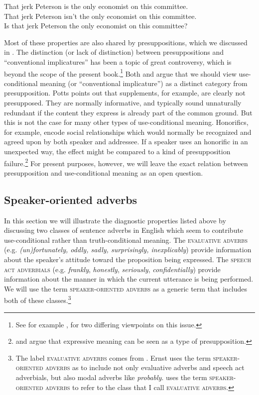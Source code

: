 \ea \label{ex:11.3}
\ea That jerk Peterson is the only economist on this committee.\\
\ex That jerk Peterson isn’t the only economist on this committee.\\
\ex Is that jerk Peterson the only economist on this committee?\\
                       \z
\z


 Most of these properties are also shared by presuppositions, which we discussed in . The distinction (or lack of distinction) between presuppositions and “conventional implicatures” has been a topic of great controversy, which is beyond the scope of the present book.\footnote{See for example  \citet{KarttunenPeters1979}, \citet{Bach1999} for two differing viewpoints on this issue.} Both \citet{Potts2005} and \citet{Gutzmann2015} argue that we should view use-conditional meaning (or “conventional implicature”) as a distinct category from presupposition. Potts points out that supplements, for example, are clearly not presupposed. They are normally informative, and typically sound unnaturally redundant if the content they express is already part of the common ground. But this is not the case for many other types of use-conditional meaning. Honorifics, for example, encode social relationships which would normally be recognized and agreed upon by both speaker and addressee. If a speaker uses an honorific in an unexpected way, the effect might be compared to a kind of presupposition failure.\footnote{\citet{Schlenker2007} and \citet{Lasersohn2007} argue that expressive meaning can be seen as a type of presupposition.}  For present purposes, however, we will leave the exact relation between presupposition and use-conditional meaning as an open question.



\subsection{Speaker-oriented adverbs}\label{sec:11.2.2}
\largerpage
In this section we will illustrate the diagnostic properties listed above by discussing two classes of sentence adverbs in English which seem to contribute use-conditional rather than truth-conditional meaning. The \textsc{evaluative adverbs (}e.g. \textit{(un)fortunately, oddly, sadly, surprisingly, inexplicably}) provide information about the speaker’s attitude toward the proposition being expressed. The \textsc{speech act adverbials} (e.g. \textit{frankly}, \textit{honestly}, \textit{seriously}, \textit{confidentially}) provide information about the manner in which the current utterance is being performed. We will use the term \textsc{speaker-oriented adverbs} as a generic term that includes both of these classes.\footnote{The label \textsc{evaluative adverbs} comes from \citet{Ernst2009}. Ernst uses the term \textsc{speaker-oriented adverbs} as to include not only evaluative adverbs and speech act adverbials, but also modal adverbs like \textit{probably}. \citet{Potts2005} uses the term \textsc{speaker-oriented adverbs} to refer to the class that I call \textsc{evaluative adverbs}.}


